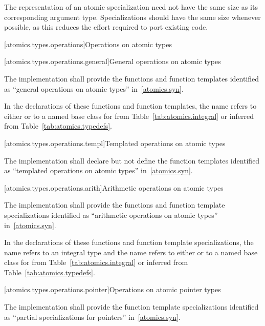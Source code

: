 \pnum
\begin{note} The representation of an atomic specialization need not have the same size as its
corresponding argument type. Specializations should have the same size whenever possible, as
this reduces the effort required to port existing code. \end{note}

[atomics.types.operations]{Operations on atomic types}

[atomics.types.operations.general]{General operations on atomic types}

\pnum
The implementation shall provide the functions and function templates identified as ``general operations
on atomic types'' in~\ref{atomics.syn}.

\pnum
In the declarations of these functions and function templates, the name
 refers to either  or to a named base class for 
from Table~\ref{tab:atomics.integral} or inferred from Table~\ref{tab:atomics.typedefs}.

[atomics.types.operations.templ]{Templated operations on atomic types}

\pnum
The implementation shall declare but not define the
function templates identified as ``templated operations on atomic types'' in~\ref{atomics.syn}.

[atomics.types.operations.arith]{Arithmetic operations on atomic types}

\pnum
The implementation shall provide the functions and function template specializations identified as ``arithmetic operations
on atomic types'' in~\ref{atomics.syn}.

%
\pnum
In the declarations of these functions and function template specializations,
the name  refers to an
integral type and the name  refers to either
 or to a named base class for  from
Table~\ref{tab:atomics.integral} or inferred from Table~\ref{tab:atomics.typedefs}.

[atomics.types.operations.pointer]{Operations on atomic pointer types}
%

\pnum
The implementation shall provide the function template specializations
identified as ``partial specializations for pointers'' in~\ref{atomics.syn}.

